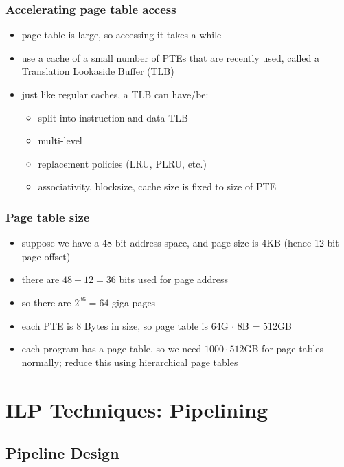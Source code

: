 \documentclass[12pt]{extarticle}
\begin{document}
	\subsubsection{Accelerating page table access}

	\begin{itemize}
		\item page table is large, so accessing it takes a while
		\item use a cache of a small number of PTEs that are recently used, called a Translation Lookaside Buffer (TLB)
		\item just like regular caches, a TLB can have/be:
		\begin{itemize}
			\item split into instruction and data TLB
			\item multi-level
			\item replacement policies (LRU, PLRU, etc.)
			\item associativity, blocksize, cache size is fixed to size of PTE
		\end{itemize}
	\end{itemize}

	\subsubsection{Page table size}

	\begin{itemize}
		\item suppose we have a 48-bit address space, and page size is 4KB (hence 12-bit page offset)
		\item there are $48 - 12 = 36$ bits used for page address
		\item so there are $2^{36} = 64$ giga pages
		\item each PTE is 8 Bytes in size, so page table is 64G $\cdot$ 8B = 512GB
		\item each program has a page table, so we need $1000 \cdot 512$GB for page tables normally; reduce this using 
		hierarchical page tables
	\end{itemize}

	\section{ILP Techniques: Pipelining}

	\subsection{Pipeline Design}
\end{document}
